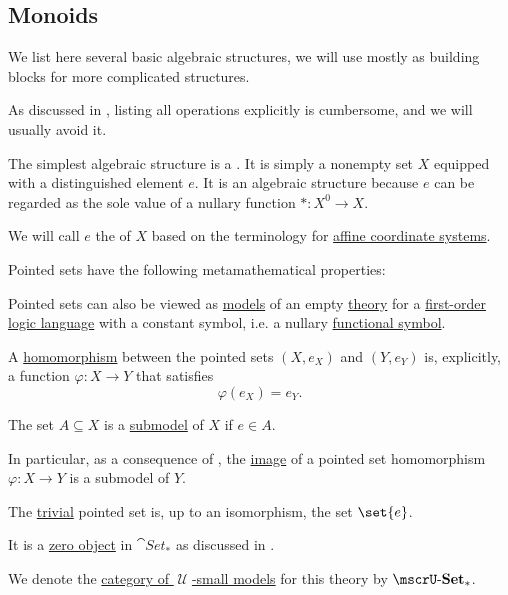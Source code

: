 \subsection{Monoids}\label{subsec:monoids}

We list here several basic algebraic structures, we will use mostly as building blocks for more complicated structures.

As discussed in , listing all operations explicitly is cumbersome, and we will usually avoid it.

\begin{definition}\label{def:pointed_set}
  The simplest algebraic structure is a . It is simply a nonempty set \( X \) equipped with a distinguished element \( e \). It is an algebraic structure because \( e \) can be regarded as the sole value of a nullary function \( *: X^0 \to X \).

  We will call \( e \) the  of \( X \) based on the terminology for \hyperref[def:euclidean_plane_coordinate_system/origin]{affine coordinate systems}.

  Pointed sets have the following metamathematical properties:
  \begin{thmenum}
     Pointed sets can also be viewed as \hyperref[def:first_order_semantics/satisfiability]{models} of an empty \hyperref[def:first_order_theory]{theory} for a \hyperref[def:first_order_language]{first-order logic language} with a constant symbol, i.e. a nullary \hyperref[def:first_order_language/func]{functional symbol}.

     A \hyperref[def:first_order_homomorphism]{homomorphism} between the pointed sets \( (X, e_{X}) \) and \( (Y, e_{Y}) \) is, explicitly, a function \( \varphi: X \to Y \) that satisfies
    \begin{equation}\label{eq:def:pointed_set/homomorphism}
      \varphi(e_{X}) = e_{Y}.
    \end{equation}

     The set \( A \subseteq X \) is a \hyperref[thm:substructure_is_model]{submodel} of \( X \) if \( e \in A \).

    In particular, as a consequence of , the \hyperref[def:multi_valued_function/image]{image} of a pointed set homomorphism \( \varphi: X \to Y \) is a submodel of \( Y \).

     The \hyperref[thm:substructures_form_complete_lattice/bottom]{trivial} pointed set is, up to an isomorphism, the set \( \set{ e } \).

    It is a \hyperref[def:universal_objects/initial]{zero object} in \( \cat{Set_*} \) as discussed in .

     We denote the \hyperref[def:category_of_small_first_order_models]{category of \( \mscrU \)-small models} for this theory by \( \ucat{Set}_* \).
  \end{thmenum}
\end{definition}

